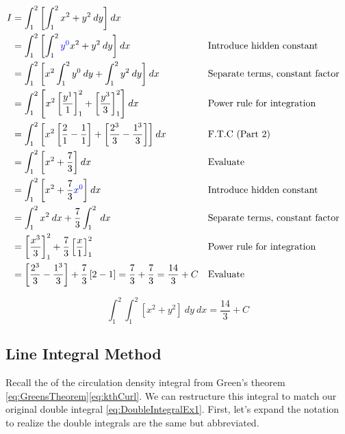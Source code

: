 \documentclass{article}
\begin{document}
\begin{equation}
    \begin{aligned}
        I &= \int_1^2{\left[ \int_1^2{x^2 + y^2} \: dy \right]}\:dx \\
        &= \int_1^2{ \left[ \int_1^2\textcolor{blue}{y^0}x^2 + y^2 \: dy\right]} \:dx && \text{Introduce hidden constant} \\
        &= \int_1^2{ \left[ x^2\int_1^2{y^0\:dy} + \int_1^2 y^2\:dy\right]} \: dx && \text{Separate terms, constant factor} \\
        &= \int_1^2{ \left[ x^2\left[\frac{y^1}{1}\right]_1^2 + \left[\frac{y^3}{3}\right]_1^2 \right]} \: dx && \text{Power rule for integration} \\
        &= \int_1^2{ \left[ x^2 \left[ \frac{2}{1} - \frac{1}{1}\right] + \left[\frac{2^3}{3} - \frac{1^3}{3}\right]\right]} \: dx && \text{F.T.C (Part 2)}\\
        &= \int_1^2{ \left[ x^2 + \frac{7}{3}\right]} \: dx && \text{Evaluate} \\
        &= \int_1^2{ \left[x^2 + \frac{7}{3}\textcolor{blue}{x^0} \right]} \: dx && \text{Introduce hidden constant}\\
        &= \int_1^2 x^2 \: dx + \frac{7}{3}\int_1^2 \: dx && \text{Separate terms, constant factor}\\
        &= \left[\frac{x^3}{3}\right]_1^2 + \frac{7}{3}\left[\frac{x}{1}\right]_1^2 && \text{Power rule for integration} \\
        &= \left[\frac{2^3}{3} - \frac{1^3}{3}\right] + \frac{7}{3}\left[2 - 1\right] = \frac{7}{3} + \frac{7}{3} = \frac{14}{3} + C && \text{Evaluate}
    \end{aligned}
\end{equation}

\begin{equation}\label{eq:DoubleIntegralResult1}
    \int_1^2\int_1^2\left[x^2 + y^2\right]\:dy\:dx = \frac{14}{3} + C
\end{equation}

\subsection{Line Integral Method}

Recall the of the circulation density integral from Green's theorem \eqref{eq:GreensTheorem}\eqref{eq:kthCurl}. We can restructure this integral to match our original double integral \eqref{eq:DoubleIntegralEx1}. First, let's expand the notation to realize the double integrals are the same but abbreviated.
\end{document}
